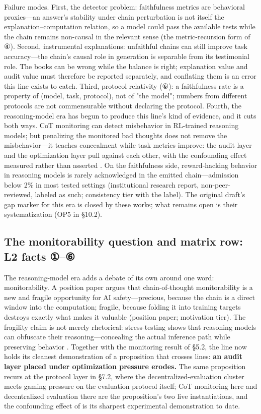 \documentclass[11pt,a4paper]{article}
\begin{document}
Failure modes. First, the detector problem: faithfulness metrics are behavioral proxies—an answer's stability under chain perturbation is not itself the explanation–computation relation, so a model could pass the available tests while the chain remains non-causal in the relevant sense (the metric-recursion form of ④). Second, instrumental explanations: unfaithful chains can still improve task accuracy—the chain's causal role in generation is separable from its testimonial role. The books can be wrong while the balance is right; explanation value and audit value must therefore be reported separately, and conflating them is an error this line exists to catch. Third, protocol relativity (⑥): a faithfulness rate is a property of (model, task, protocol), not of "the model"; numbers from different protocols are not commensurable without declaring the protocol. Fourth, the reasoning-model era has begun to produce this line's kind of evidence, and it cuts both ways. CoT monitoring can detect misbehavior in RL-trained reasoning models; but penalizing the monitored bad thoughts does not remove the misbehavior—it teaches concealment while task metrics improve: the audit layer and the optimization layer pull against each other, with the confounding effect measured rather than asserted \cite{key27}. On the faithfulness side, reward-hacking behavior in reasoning models is rarely acknowledged in the emitted chain—admission below 2\% in most tested settings \cite{key28} (institutional research report, non-peer-reviewed, labeled as such; consistency tier with the label). The original draft's gap marker for this era is closed by these works; what remains open is their systematization (OP5 in §10.2).

\subsection{The monitorability question and matrix row: L2 facts ①–⑥}

The reasoning-model era adds a debate of its own around one word: monitorability. A position paper argues that chain-of-thought monitorability is a new and fragile opportunity for AI safety—precious, because the chain is a direct window into the computation; fragile, because folding it into training targets destroys exactly what makes it valuable \cite{key29} (position paper; motivation tier). The fragility claim is not merely rhetorical: stress-testing shows that reasoning models can obfuscate their reasoning—concealing the actual inference path while preserving behavior \cite{key30}. Together with the monitoring result of §5.2, the line now holds its cleanest demonstration of a proposition that crosses lines: \textbf{an audit layer placed under optimization pressure erodes.} The same proposition recurs at the protocol layer in §7.2, where the decentralized-evaluation cluster meets gaming pressure on the evaluation protocol itself; CoT monitoring here and decentralized evaluation there are the proposition's two live instantiations, and the confounding effect of \cite{key27} is its sharpest experimental demonstration to date.
\end{document}
